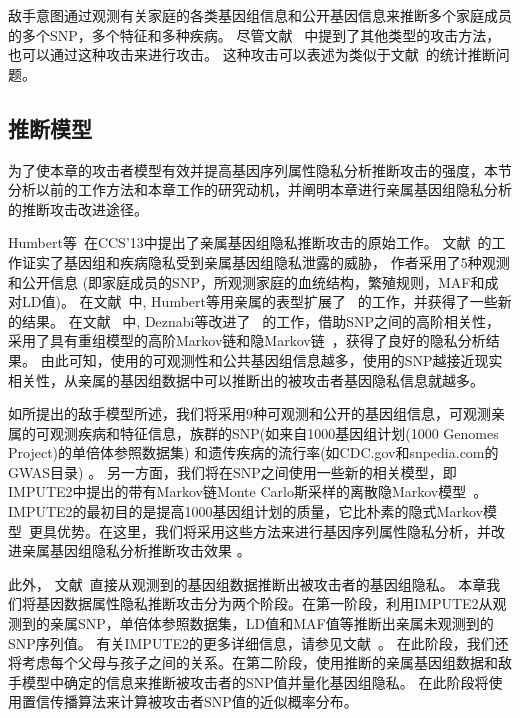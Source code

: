 敌手意图通过观测有关家庭的各类基因组信息和公开基因信息来推断多个家庭成员的多个SNP，多个特征和多种疾病。 尽管文献~\cite{humbert2013addressing} 中提到了其他类型的攻击方法，也可以通过这种攻击来进行攻击。 这种攻击可以表述为类似于文献~\cite{humbert2013addressing,humbert2017quantifying,deznabi2018inference}的统计推断问题。

\subsection{推断模型}

为了使本章的攻击者模型有效并提高基因序列属性隐私分析推断攻击的强度，本节分析以前的工作方法和本章工作的研究动机，并阐明本章进行亲属基因组隐私分析的推断攻击改进途径。

Humbert等~\cite{humbert2013addressing}在CCS'13中提出了亲属基因组隐私推断攻击的原始工作。 文献~\cite{humbert2013addressing}的工作证实了基因组和疾病隐私受到亲属基因组隐私泄露的威胁， 作者采用了5种观测和公开信息 (即家庭成员的SNP，所观测家庭的血统结构，繁殖规则，MAF和成对LD值)。 在文献~\cite{humbert2017quantifying}中, Humbert等用亲属的表型扩展了~\cite{humbert2013addressing} 的工作，并获得了一些新的结果。
在文献~\cite{deznabi2018inference} 中, Deznabi等改进了~\cite{humbert2013addressing} 的工作，借助SNP之间的高阶相关性，采用了具有重组模型的高阶Markov链和隐Markov链~\cite{marchini2007newa,samani2015quantifying}，获得了良好的隐私分析结果。
由此可知，使用的可观测性和公共基因组信息越多，使用的SNP越接近现实相关性，从亲属的基因组数据中可以推断出的被攻击者基因隐私信息就越多。

如所提出的敌手模型所述，我们将采用9种可观测和公开的基因组信息，可观测亲属的可观测疾病和特征信息，族群的SNP(如来自1000基因组计划(1000 Genomes Project)的单倍体参照数据集) 和遗传疾病的流行率(如CDC.gov和snpedia.com的GWAS目录) 。 另一方面，我们将在SNP之间使用一些新的相关模型，即IMPUTE2中提出的带有Markov链Monte Carlo斯采样的离散隐Markov模型~\cite{howie2014impute2}。IMPUTE2的最初目的是提高1000基因组计划的质量，它比朴素的隐式Markov模型~\cite{marchini2007newa,samani2015quantifying}更具优势。在这里，我们将采用这些方法来进行基因序列属性隐私分析，并改进亲属基因组隐私分析推断攻击效果 。

此外， 文献~\cite{humbert2013addressing,humbert2017quantifying,deznabi2018inference}直接从观测到的基因组数据推断出被攻击者的基因组隐私。 本章我们将基因数据属性隐私推断攻击分为两个阶段。在第一阶段，利用IMPUTE2从观测到的亲属SNP，单倍体参照数据集，LD值和MAF值等推断出亲属未观测到的SNP序列值。 有关IMPUTE2的更多详细信息，请参见文献~\cite{howie2014impute2}。
在此阶段，我们还将考虑每个父母与孩子之间的关系。在第二阶段，使用推断的亲属基因组数据和敌手模型中确定的信息来推断被攻击者的SNP值并量化基因组隐私。 在此阶段将使用置信传播算法来计算被攻击者SNP值的近似概率分布。

